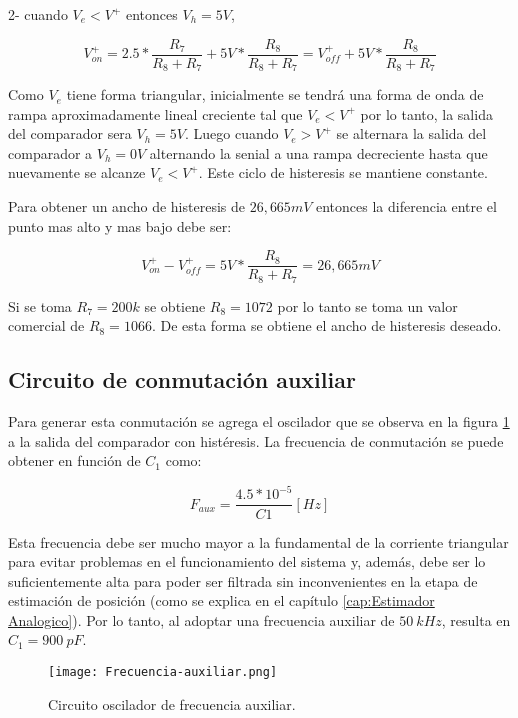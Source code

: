 2- cuando $V_e<V^+$ entonces $V_h=5V$, 

\begin{equation}
	V^+_{on}=2.5*\frac{R_{7}}{R_{8}+R_{7}} + 5V*\frac{R_{8}}{R_{8}+R_{7}}=V^+_{off}+5V*\frac{R_{8}}{R_{8}+R_{7}}
\end{equation}

Como $V_{e}$ tiene forma triangular, inicialmente se tendrá una forma de onda de rampa aproximadamente lineal creciente tal que $V_e<V^+$ por lo tanto, la salida del comparador sera $V_{h}=5 V$. Luego cuando $V_e>V^+$ se alternara la salida del comparador a $V_{h}=0 V$ alternando la senial a una rampa decreciente hasta que nuevamente se alcanze $V_e<V^+$. Este ciclo de histeresis se mantiene constante.

Para obtener un ancho de histeresis de $26,665 mV$ entonces la diferencia entre el punto mas alto y mas bajo debe ser:

\begin{equation}
	V^+_{on}-V^+_{off} = 5V*\frac{R_{8}}{R_{8}+R_{7}}= 26,665 mV
\end{equation}

Si se toma $R_{7}=200 k$ se obtiene $R_{8}=1072 $ por lo tanto se toma un valor comercial de $R_{8}=1066$. De esta forma se obtiene el ancho de histeresis deseado.

\subsection{Circuito de conmutación auxiliar}
\noindent Para generar esta conmutación se agrega el oscilador que se observa en la figura \ref{fig:img_frecuencia-auxiliar} a la salida del comparador con histéresis. La frecuencia de conmutación se puede obtener en función de $C_1$ como:

\begin{equation} 
	F_{aux} = \frac{4.5*10^{-5}}{C1} [Hz]
\end{equation}


\noindent Esta frecuencia debe ser mucho mayor a la fundamental de la corriente triangular para evitar problemas en el funcionamiento del sistema y, además, debe ser lo suficientemente alta para poder ser filtrada sin inconvenientes en la etapa de estimación de posición (como se explica en el capítulo \ref{cap:Estimador Analogico}). Por lo tanto, al adoptar una frecuencia auxiliar de $50\:kHz$, resulta en $C_1= 900\:pF$.

\begin{figure}[H]
	\centering
	\texttt{[image: Frecuencia-auxiliar.png]}
	\caption{Circuito oscilador de frecuencia auxiliar.}
	\label{fig:img_frecuencia-auxiliar}
\end{figure}


